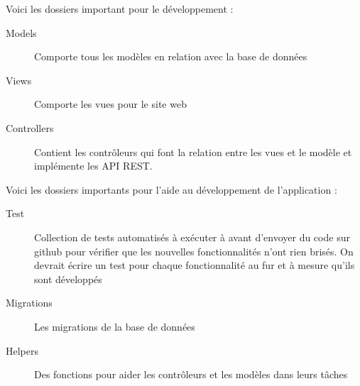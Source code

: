 	\noindent Voici les dossiers important pour le développement :
	\begin{description}
		\item[Models] Comporte tous les modèles en relation avec la base de données
		\item[Views] Comporte les vues pour le site web
		\item [Controllers] Contient les contrôleurs qui font la relation entre les vues et le modèle et implémente les API REST.
	\end{description}

	\noindent Voici les dossiers importants pour l’aide au développement de l’application :
	\begin{description}
		\item[Test] Collection de tests automatisés à exécuter à avant d’envoyer du code sur github pour vérifier que les nouvelles fonctionnalités n’ont rien brisés. On devrait écrire un test pour chaque fonctionnalité au fur et à mesure qu’ils sont développés
		\item[Migrations] Les migrations de la base de données
		\item [Helpers] Des fonctions pour aider les contrôleurs et les modèles dans leurs tâches
	\end{description}
